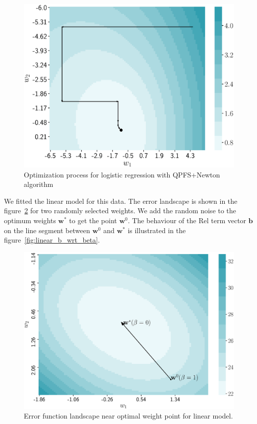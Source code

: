 \documentclass[a4paper,12pt]{article}
\theoremstyle{plain} %
\theoremstyle{definition} %
\theoremstyle{remark} %
\newcommand{\bb}{\mathbf{b}}
\newcommand{\bw}{\mathbf{w}}
\begin{document}
  	\begin{figure}[!h]	
  		\centering
  		\includegraphics[width=0.6\linewidth]{figs/irls_qpfs_2d.eps}	 
  		\caption{Optimization process for logistic regression with QPFS+Newton algorithm}
  		\label{fig:irls_qpfs_2d}
  	\end{figure}
  	
  	\hrulefill
  
  We fitted the linear model for this data.
  The error landscape is shown in the figure~\ref{fig:linear_error} for two randomly selected weights. 
  We add the random noise to the optimum weights $\bw^*$ to get the point $\bw^0$. The behaviour of the Rel term vector $\bb$ on the line segment between $\bw^0$ and $\bw^*$ is illustrated in the figure~\ref{fig:linear_b_wrt_beta}.

	\begin{figure}[!h]	
		\centering
		\includegraphics[width=0.8\linewidth]{figs/linear_error.eps}	 
		\caption{Error function landscape near optimal weight point for linear model.}
		\label{fig:linear_error}
	\end{figure}
\end{document}
